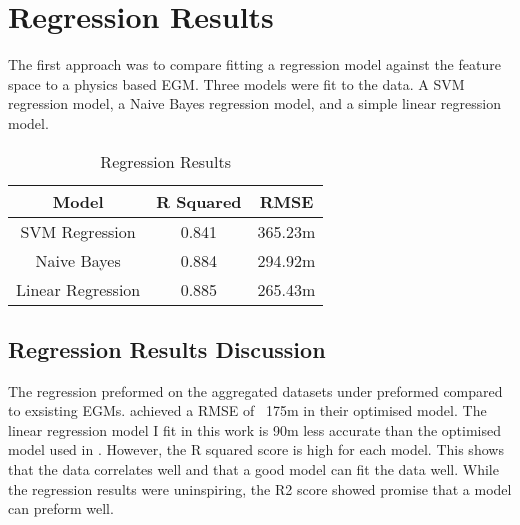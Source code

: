 \section{Regression Results}
The first approach was to compare fitting a regression model against the feature space to a physics based \ac{EGM}.
Three models were fit to the data. 
A SVM regression model, a Naive Bayes regression model, and a simple linear regression model.

\begin{center}
    \begin{table}[htb]
        \begin{tabular}{|c c c|}
            \hline
				\textbf{Model} & \textbf{R Squared} & \textbf{RMSE} \\
				\hline
				SVM Regression & 0.841 & 365.23m \\
				Naive Bayes & 0.884 & 294.92m \\
				Linear Regression & 0.885 & 265.43m \\
				\hline
        \end{tabular}
        \label{table:REGRESSION_RESULTS}
        \caption{Regression Results}
    \end{table}
\end{center}

\subsection{Regression Results Discussion}
The regression preformed on the aggregated datasets under preformed compared to exsisting \ac{EGM}s.
\cite{jena2012prediction} achieved a \ac{RMSE} of ~175m in their optimised model.
The linear regression model I fit in this work is 90m less accurate than the optimised model used in \cite{jena2012prediction}.
However, the R squared score is high for each model. 
This shows that the data correlates well and that a good model can fit the data well.
While the regression results were uninspiring, the R2 score showed promise that a model can preform well.



%
%



